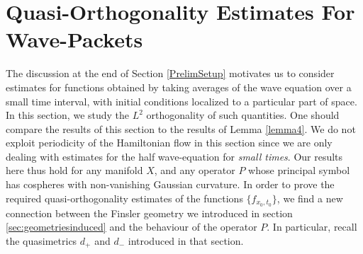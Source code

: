 \section{Quasi-Orthogonality Estimates For Wave-Packets} \label{estimatesforwavepackets}

The discussion at the end of Section \ref{PrelimSetup} motivates us to consider estimates for functions obtained by taking averages of the wave equation over a small time interval, with initial conditions localized to a particular part of space. In this section, we study the $L^2$ orthogonality of such quantities. One should compare the results of this section to the results of Lemma \ref{lemma4}. We do not exploit periodicity of the Hamiltonian flow in this section since we are only dealing with estimates for the half wave-equation for \emph{small times}. Our results here thus hold for any manifold $X$, and any operator $P$ whose principal symbol has cospheres with non-vanishing Gaussian curvature. In order to prove the required quasi-orthogonality estimates of the functions $\{ f_{x_0,t_0} \}$, we find a new connection between the Finsler geometry we introduced in section \ref{sec:geometriesinduced} and the behaviour of the operator $P$. In particular, recall the quasimetrics $d_+$ and $d_-$ introduced in that section.

